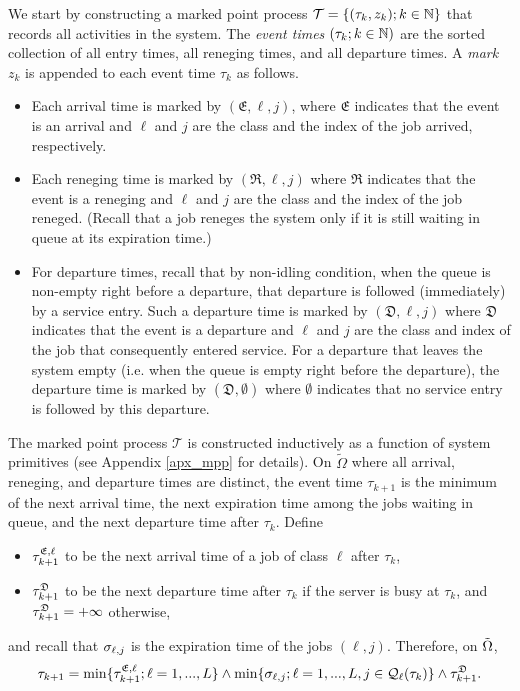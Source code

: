 \documentclass{article}
\theoremstyle{definition}
\numberwithin{equation}{section}
\begin{document}
We start by constructing a marked point process  ${\mathcal{T}}=\{(\tau_k,z_k);k\in\mathbb{N}\}$ that records all activities in the system. The \textit{event times} $(\tau_k;k\in\mathbb{N})$ are the sorted collection of all entry times, all reneging times, and all departure times. A \textit{mark} $z_k$ is appended to each event time $\tau_k$ as follows.
\begin{itemize}
\item Each arrival time is marked by $(\mathfrak{E}, \ell,j)$, where $\mathfrak{E}$ indicates that the event is an arrival and $\ell$ and $j$ are the class and the index of the job arrived, respectively.
\item Each reneging time is marked by $(\mathfrak{R},\ell,j)$ where $\mathfrak{R}$ indicates that the event is a reneging and $\ell$ and $j$ are the class and the index of the job reneged. (Recall that a job reneges the system only if it is still waiting in queue at its expiration time.)
\item For departure times, recall that by non-idling condition, when the queue is non-empty right before a departure, that departure is followed (immediately) by a service entry. Such  a departure time is marked by $(\mathfrak{D},\ell,j)$ where $\mathfrak{D}$ indicates that the event is a departure and $\ell$ and $j$ are the class and index of the job that consequently entered service. For a departure that leaves the system empty (i.e. when the queue is empty right before the departure), the departure time is marked by $(\mathfrak{D},\emptyset)$ where $\emptyset$ indicates that no service entry is followed by this departure.
\end{itemize}

The marked point process $\mathcal{T}$ is constructed inductively as a function of system primitives (see Appendix \ref{apx_mpp} for details). On $\tilde\Omega$ where all arrival, reneging, and departure times are distinct, the event time $\tau_{k+1}$ is the minimum of the next arrival time, the next expiration time among the jobs waiting in queue, and the next departure time after $\tau_k$. Define
\begin{itemize}
  \item $\tau^{\mathfrak{E},\ell}_{k+1}$ to be the next arrival time of a job of class $\ell$ after $\tau_{k}$,
  \item $\tau^{\mathfrak{D}}_{k+1}$ to be the next departure time after $\tau_k$ if the server is busy at $\tau_k$, and $\tau^{\mathfrak{D}}_{k+1}=+\infty$ otherwise,
\end{itemize}
and recall that $\sigma_{\ell,j}$ is the expiration time of the jobs $(\ell,j)$. Therefore, on $\tilde \Omega$,
\begin{equation}\label{next_event}
  \tau_{k+1}= \min\{\tau^{\mathfrak{E},\ell}_{k+1};\ell=1,...,L\} \wedge \min\{\sigma_{\ell,j}; \ell=1,...,L,j\in\mathcal{Q}_\ell(\tau_k) \} \wedge \tau^{\mathfrak{D}}_{k+1}.
\end{equation}
\end{document}
